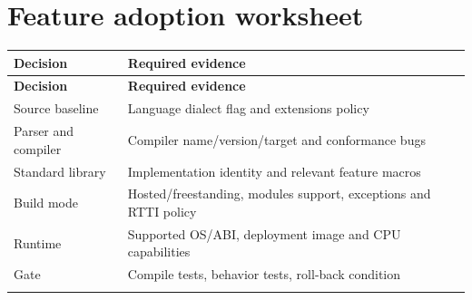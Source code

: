 \documentclass[11pt]{article}
\begin{document}
\section{Feature adoption worksheet}
\small
\begin{longtable}{@{}p{.25\linewidth}p{.69\linewidth}@{}}
\toprule
\textbf{Decision} & \textbf{Required evidence}\\
\midrule
\endfirsthead
\toprule
\textbf{Decision} & \textbf{Required evidence}\\
\midrule
\endhead
Source baseline & Language dialect flag and extensions policy\\
\addlinespace[2pt]
Parser and compiler & Compiler name/version/target and conformance bugs\\
\addlinespace[2pt]
Standard library & Implementation identity and relevant feature macros\\
\addlinespace[2pt]
Build mode & Hosted/freestanding, modules support, exceptions and RTTI policy\\
\addlinespace[2pt]
Runtime & Supported OS/ABI, deployment image and CPU capabilities\\
\addlinespace[2pt]
Gate & Compile tests, behavior tests, roll-back condition\\
\addlinespace[2pt]
\bottomrule
\end{longtable}
\normalsize
\docend
\end{document}
